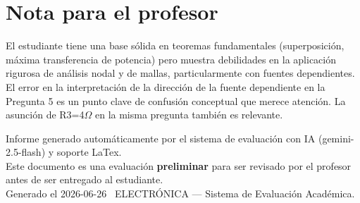 \documentclass[11pt,a4paper]{article}
\begin{document}
\section*{Nota para el profesor}
\begin{tcolorbox}[
  enhanced, breakable,
  colback=yellow!8, colframe=yellow!60!black,
  fonttitle=\bfseries, coltitle=black,
  title={Observaciones para revisión manual},
  top=4pt, bottom=4pt, left=8pt, right=8pt,
]
El estudiante tiene una base sólida en teoremas fundamentales (superposición, máxima transferencia de potencia) pero muestra debilidades en la aplicación rigurosa de análisis nodal y de mallas, particularmente con fuentes dependientes. El error en la interpretación de la dirección de la fuente dependiente en la Pregunta 5 es un punto clave de confusión conceptual que merece atención. La asunción de R3=4$\Omega$ en la misma pregunta también es relevante.
\end{tcolorbox}

\vspace{12pt}
\begin{center}
  \footnotesize\color{gray}
  Informe generado automáticamente por el sistema de evaluación con IA (gemini-2.5-flash) y soporte LaTex. \\
  Este documento es una evaluación \textbf{preliminar} para ser revisado por el profesor antes de ser entregado al 
  estudiante. \\
  Generado el 2026-06-26 \textbullet\ ELECTRÓNICA --- Sistema de Evaluación Académica.
  \end{center}
\end{document}
